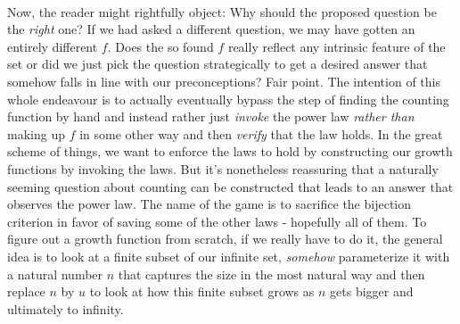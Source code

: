 \documentclass[12pt]{article}
\begin{document}
\paragraph{} 
Now, the reader might rightfully object: Why should the proposed question be the \emph{right} one? If we had asked a different question, we may have gotten an entirely different $f$. Does the so found $f$ really reflect any intrinsic feature of the set or did we just pick the question strategically to get a desired answer that somehow falls in line with our preconceptions? Fair point. The intention of this whole endeavour is to actually eventually bypass the step of finding the counting function by hand and instead rather just \emph{invoke} the power law \emph{rather than} making up $f$ in some other way and then \emph{verify} that the law holds. In the great scheme of things, we want to enforce the laws to hold by constructing our growth functions by invoking the laws. But it's nonetheless reassuring that a naturally seeming question about counting can be constructed that leads to an answer that observes the power law. The name of the game is to sacrifice the bijection criterion in favor of saving some of the other laws - hopefully all of them. To figure out a growth function from scratch, if we really have to do it, the general idea is to look at a finite subset of our infinite set, \emph{somehow} parameterize it with a natural number $n$ that captures the size in the most natural way and then replace $n$ by $u$ to look at how this finite subset grows as $n$ gets bigger and ultimately to infinity.

\end{document}
